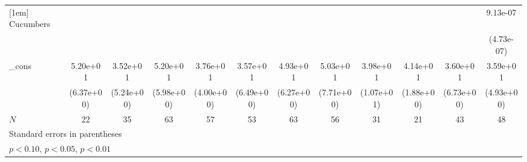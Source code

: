 \begin{table}[htbp]
\begin{tabular}{l*{11}{c}}
[1em]
Cucumbers   &                     &                     &                     &                     &                     &                     &                     &                     &                     &                     &    9.13e-07         \\
            &                     &                     &                     &                     &                     &                     &                     &                     &                     &                     &  (4.73e-07)         \\
[1em]
\_cons      &    5.20e+01\sym{***}&    3.52e+01\sym{***}&    5.20e+01\sym{***}&    3.76e+01\sym{***}&    3.57e+01\sym{***}&    4.93e+01\sym{***}&    5.03e+01\sym{***}&    3.98e+01\sym{***}&    4.14e+01\sym{***}&    3.60e+01\sym{***}&    3.59e+01\sym{***}\\
            &  (6.37e+00)         &  (5.24e+00)         &  (5.98e+00)         &  (4.00e+00)         &  (6.49e+00)         &  (6.27e+00)         &  (7.71e+00)         &  (1.07e+01)         &  (1.88e+00)         &  (6.73e+00)         &  (4.93e+00)         \\
\hline
\(N\)       &          22         &          35         &          63         &          57         &          53         &          63         &          56         &          31         &          21         &          43         &          48         \\
\hline\hline
\multicolumn{12}{l}{\footnotesize Standard errors in parentheses}\\
\multicolumn{12}{l}{\footnotesize \sym{*} \(p<0.10\), \sym{**} \(p<0.05\), \sym{***} \(p<0.01\)}\\
\end{tabular}
\end{table}
